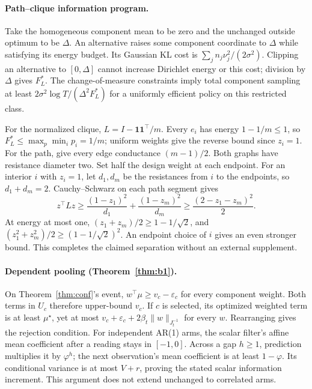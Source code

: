 \documentclass[sigconf,review,anonymous]{acmart}
\begin{document}
\paragraph{Path--clique information program.}
Take the homogeneous component mean to be zero and the unchanged outside optimum to be $\Delta$. An alternative raises some component coordinate to $\Delta$ while satisfying its energy budget. Its Gaussian KL cost is $\sum_j n_j\nu_j^2/(2\sigma^2)$. Clipping an alternative to $[0,\Delta]$ cannot increase Dirichlet energy or this cost; division by $\Delta$ gives $F_L^*$. The change-of-measure constraints imply total component sampling at least $2\sigma^2\log T/(\Delta^2F_L^*)$ for a uniformly efficient policy on this restricted class.

For the normalized clique, $L=I-\mathbf1\mathbf1^\top/m$. Every $e_i$ has energy $1-1/m\le1$, so $F_L^*\le\max_p\min_i p_i=1/m$; uniform weights give the reverse bound since $z_i=1$. For the path, give every edge conductance $(m-1)/2$. Both graphs have resistance diameter two. Set half the design weight at each endpoint. For an interior $i$ with $z_i=1$, let $d_1,d_m$ be the resistances from $i$ to the endpoints, so $d_1+d_m=2$. Cauchy--Schwarz on each path segment gives
\[
z^\top Lz\ge\frac{(1-z_1)^2}{d_1}+\frac{(1-z_m)^2}{d_m}
\ge\frac{(2-z_1-z_m)^2}{2}.
\]
At energy at most one, $(z_1+z_m)/2\ge1-1/\sqrt2$, and $(z_1^2+z_m^2)/2\ge(1-1/\sqrt2)^2$. An endpoint choice of $i$ gives an even stronger bound. This completes the claimed separation without an external supplement.

\paragraph{Dependent pooling (Theorem~\ref{thm:b1}).}
On Theorem~\ref{thm:conf}'s event, $w^\top\mu\ge v_c-\varepsilon_c$ for every component weight. Both terms in $U_c$ therefore upper-bound $v_c$. If $c$ is selected, its optimized weighted term is at least $\mu^\star$, yet at most $v_c+\varepsilon_c+2\beta_t\|w\|_{J_t^{-1}}$ for every $w$. Rearranging gives the rejection condition. For independent AR(1) arms, the scalar filter's affine mean coefficient after a reading stays in $[-1,0]$. Across a gap $h\ge1$, prediction multiplies it by $\varphi^h$; the next observation's mean coefficient is at least $1-\varphi$. Its conditional variance is at most $V+r$, proving the stated scalar information increment. This argument does not extend unchanged to correlated arms.
\end{document}
